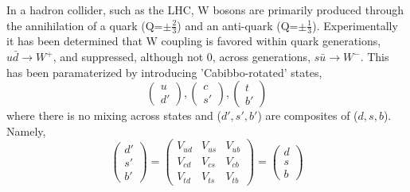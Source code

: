 In a hadron collider, such as the LHC, W bosons are primarily produced
through the annihilation of a quark (Q=$\pm\frac{2}{3}$) and an anti-quark (Q=$\pm\frac{1}{3}$). 
Experimentally it has been determined that W coupling is favored within quark generations,
$u\bar{d}\rightarrow W^{+}$,
and suppressed, although not 0, across generations, $s\bar{u}\rightarrow W^{-}$.
This has been paramaterized by introducing 'Cabibbo-rotated' states, 
\begin{equation}
\left(
    \begin{array}{c}
      u \\
      d' 
    \end{array}
  \right),
  \left(
    \begin{array}{c}
      c \\
      s' 
    \end{array}
  \right),
\left(
    \begin{array}{c}
      t \\
      b' 
    \end{array}
  \right)  
\end{equation}
where there is no mixing across states and ($d',s',b'$) are composites
of ($d,s,b$). Namely,
\begin{equation}
\left(
    \begin{array}{c}
      d' \\
      s'  \\
      b'
    \end{array}
  \right)
  =
  \begin{pmatrix}
  V_{ud} & V_{us} & V_{ub}\\
  V_{cd} & V_{cs} & V_{cb}\\
  V_{td} & V_{ts} & V_{tb}
  \end{pmatrix}
  =
  \left(
    \begin{array}{c}
      d \\
      s  \\
      b
    \end{array}
  \right)
\end{equation}
